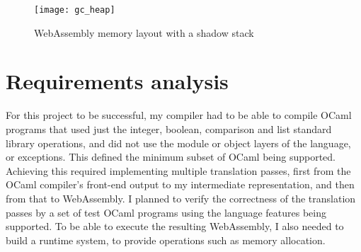 



\hspace{-0.18cm}
\begin{figure}[H]
\texttt{[image: gc\_heap]}
\caption{WebAssembly memory layout with a shadow stack}
\label{fig:wasm-shadow}
\end{figure}





\section{Requirements analysis}
For this project to be successful, my compiler had to be able to compile OCaml programs that used just the integer, boolean, comparison and list standard library operations, and did not use the module or object layers of the language, or exceptions. This defined the minimum subset of OCaml being supported. Achieving this required implementing multiple translation passes, first from the OCaml compiler's front-end output to my intermediate representation, and then from that to WebAssembly. I planned to verify the correctness of the translation passes by a set of test OCaml programs using the language features being supported. To be able to execute the resulting WebAssembly, I also needed to build a runtime system, to provide operations such as memory allocation. 


